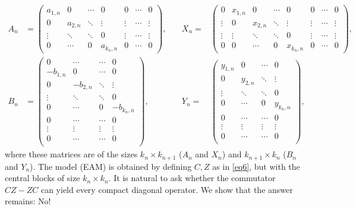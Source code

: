 \documentclass[10pt,reqno]{amsart}
\theoremstyle{remark}
\numberwithin{equation}{section}
\begin{document}
\begin{equation}
  \label{blockseam}
  \begin{alignedat}{2}
    A_n &=
    \begin{pmatrix}
      a_{1,n} & 0 & \cdots   & 0 & 0 & \cdots & 0 \\
      0 & a_{2,n}  & \ddots  & \vdots & \vdots & \cdots & \vdots \\
      \vdots &\ddots & \ddots & 0 & \vdots & \cdots & \vdots \\
      0 & \cdots & 0 & a_{k_n,n} & 0 & \cdots & 0
    \end{pmatrix},\quad
    &X_n =&
    \begin{pmatrix}
      0 & x_{1,n} & 0  & \cdots & 0 & 0 & \cdots & 0 \\
      \vdots & 0 & x_{2,n} & \ddots & \vdots & \vdots & \cdots & \vdots \\
      \vdots & \vdots & \ddots & \ddots & 0 & \vdots & \cdots & \vdots \\
      0 & 0 & \cdots & 0 & x_{k_n,n} & 0 & \cdots & 0
    \end{pmatrix},\\
    B_n &=
    \begin{pmatrix}
      0 & \cdots &\cdots & 0 \\
      -b_{1,n} & 0 & \cdots & 0 \\
      0 &-b_{2,n}  & \ddots & \vdots \\
      \vdots & \ddots & \ddots & 0 \\
      0 & \cdots & 0 & -b_{k_n,n} \\
      0 & \cdots &\cdots & 0 \\
      \vdots & \vdots & \vdots & \vdots \\
      0 & \cdots &\cdots & 0 \\
    \end{pmatrix},\quad
    &Y_n =&
    \begin{pmatrix}
      y_{1,n} & 0  & \cdots  & 0 \\
      0 & y_{2,n} & \ddots & \vdots \\
      \vdots & \ddots & \ddots & 0 \\
      0 & \cdots & 0 & y_{k_n,n}\\
      0 & \cdots & \cdots & 0 \\
      \vdots & \vdots & \vdots & \vdots \\
      0 & \cdots &\cdots & 0 \\
    \end{pmatrix},
  \end{alignedat}
\end{equation}
where these matrices are of the sizes $k_n\times k_{n+1}$ ($A_n$ and $X_n$) and $k_{n+1}\times k_{n}$ ($B_n$ and $Y_n$).
The model (EAM) is obtained by defining  $C,Z$ as in \eqref{eq6}, but with the central blocks of size $k_n\times k_n$.
It is natural to ask whether the commutator $CZ-ZC$ can yield every compact diagonal operator.
We show that the answer remains: No!
\end{document}
